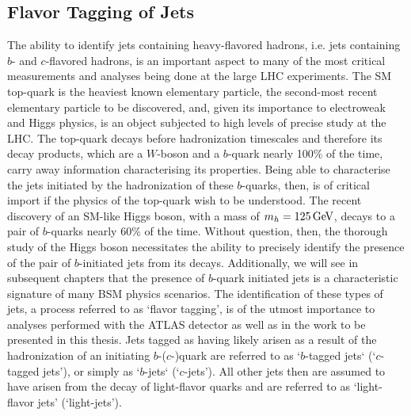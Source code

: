 \subsection{Flavor Tagging of Jets}
\label{sec:flavor_tagging}

The ability to identify jets containing heavy-flavored hadrons, i.e. jets containing
$b$- and $c$-flavored hadrons, is an important aspect to many of the most critical measurements
and analyses being done at the large LHC experiments.
The SM top-quark is the heaviest known elementary particle, the second-most recent elementary particle to be discovered,
and, given its importance to electroweak and Higgs physics, is an object subjected to high levels
of precise study at the LHC.
The top-quark decays before hadronization timescales and therefore its decay products, which
are a $W$-boson and a $b$-quark nearly 100\% of the time, carry away information characterising its properties.
Being able to characterise the jets initiated by the hadronization of these $b$-quarks, then,
is of critical import if the physics of the top-quark wish to be understood.
The recent discovery of an SM-like Higgs boson, with a mass of $m_h = 125\,\text{Ge\kern -0.1em V}$, decays
to a pair of $b$-quarks nearly 60\% of the time.
Without question, then, the thorough study of the Higgs boson necessitates the ability to precisely identify
the presence of the pair of $b$-initiated jets from its decays.
Additionally, we will see in subsequent chapters that the presence of $b$-quark initiated jets is
a characteristic signature of many BSM physics scenarios.
The identification of these types of jets, a process referred to as `flavor tagging', is of the utmost importance
to analyses performed with the ATLAS detector as well as in the work to be presented in this thesis.
Jets tagged as having likely arisen as a result of the hadronization of an initiating $b$-($c$-)quark
are referred to as `$b$-tagged jets` (`$c$-tagged jets'), or simply as `$b$-jets` (`$c$-jets').
All other jets then are assumed to have arisen from the decay of light-flavor quarks and are referred to as `light-flavor jets' (`light-jets').


